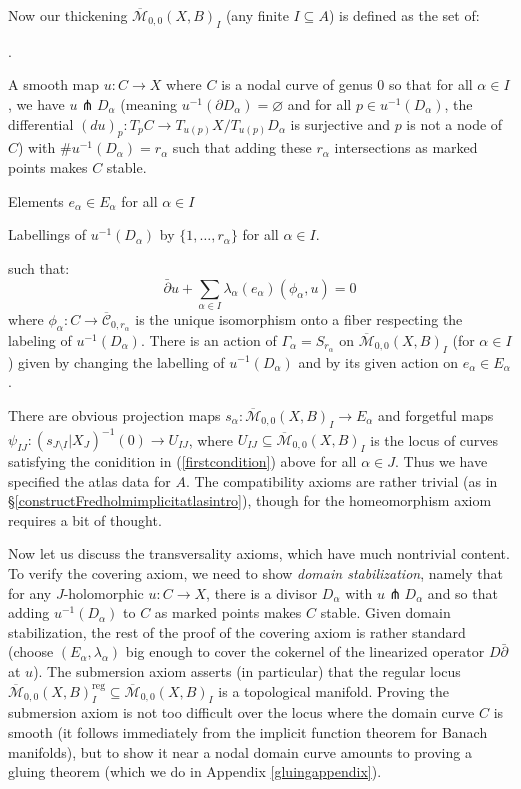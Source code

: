 \documentclass[12pt]{article}
\theoremstyle{definition}
\theoremstyle{remark}
\numberwithin{equation}{subsection}
\newcommand{\Mbar}{\overline{\mathcal M}}
\newcommand{\Cbar}{\overline{\mathcal C}}
\newcommand{\delbar}{\bar\partial}
\newcommand{\reg}{\mathrm{reg}}
\newcounter{rcounti}
\newenvironment{rlist}{\begin{list}{\roman{rcounti}.}{\usecounter{rcounti}
\setlength\itemsep{0pt}
\setlength\labelsep{4pt}
\setlength\labelwidth{16pt}
\setlength\leftmargin{32pt}
\setlength\listparindent{0pt}
\setlength\parsep{0pt}
\setlength\parskip{0pt}
\setlength\partopsep{0pt}
\setlength\rightmargin{0pt}
\setlength\topsep{0pt}
\setlength\itemindent{0pt}
}}{\end{list}}
\begin{document}
Now our thickening $\Mbar_{0,0}(X,B)_I$ (any finite $I\subseteq A$) is defined as the set of:
\begin{rlist}
\item\label{firstcondition}A smooth map $u:C\to X$ where $C$ is a nodal curve of genus $0$ so that for all $\alpha\in I$, we have $u\pitchfork D_\alpha$ (meaning $u^{-1}(\partial D_\alpha)=\varnothing$ and for all $p\in u^{-1}(D_\alpha)$, the differential $(du)_p:T_pC\to T_{u(p)}X/T_{u(p)}D_\alpha$ is surjective and $p$ is not a node of $C$) with $\#u^{-1}(D_\alpha)=r_\alpha$ such that adding these $r_\alpha$ intersections as marked points makes $C$ stable.
\item Elements $e_\alpha\in E_\alpha$ for all $\alpha\in I$
\item Labellings of $u^{-1}(D_\alpha)$ by $\{1,\ldots,r_\alpha\}$ for all $\alpha\in I$.
\end{rlist}
such that:
\begin{equation}\label{thickenedintro}
\delbar u+\sum_{\alpha\in I}\lambda_\alpha(e_\alpha)(\phi_\alpha,u)=0
\end{equation}
where $\phi_\alpha:C\to\Cbar_{0,r_\alpha}$ is the unique isomorphism onto a fiber respecting the labeling of $u^{-1}(D_\alpha)$.  There is an action of $\Gamma_\alpha=S_{r_\alpha}$ on $\Mbar_{0,0}(X,B)_I$ (for $\alpha\in I$) given by changing the labelling of $u^{-1}(D_\alpha)$ and by its given action on $e_\alpha\in E_\alpha$.

There are obvious projection maps $s_\alpha:\Mbar_{0,0}(X,B)_I\to E_\alpha$ and forgetful maps $\psi_{IJ}:(s_{J\setminus I}|X_J)^{-1}(0)\to U_{IJ}$, where $U_{IJ}\subseteq\Mbar_{0,0}(X,B)_I$ is the locus of curves satisfying the conidition in (\ref{firstcondition}) above for all $\alpha\in J$.  Thus we have specified the atlas data for $A$.  The compatibility axioms are rather trivial (as in \S\ref{constructFredholmimplicitatlasintro}), though for the homeomorphism axiom requires a bit of thought.

Now let us discuss the transversality axioms, which have much nontrivial content.  To verify the covering axiom, we need to show \emph{domain stabilization}, namely that for any $J$-holomorphic $u:C\to X$, there is a divisor $D_\alpha$ with $u\pitchfork D_\alpha$ and so that adding $u^{-1}(D_\alpha)$ to $C$ as marked points makes $C$ stable.  Given domain stabilization, the rest of the proof of the covering axiom is rather standard (choose $(E_\alpha,\lambda_\alpha)$ big enough to cover the cokernel of the linearized operator $D\delbar$ at $u$).  The submersion axiom asserts (in particular) that the regular locus $\Mbar_{0,0}(X,B)_I^\reg\subseteq\Mbar_{0,0}(X,B)_I$ is a topological manifold.  Proving the submersion axiom is not too difficult over the locus where the domain curve $C$ is smooth (it follows immediately from the implicit function theorem for Banach manifolds), but to show it near a nodal domain curve amounts to proving a gluing theorem (which we do in Appendix \ref{gluingappendix}).
\end{document}
